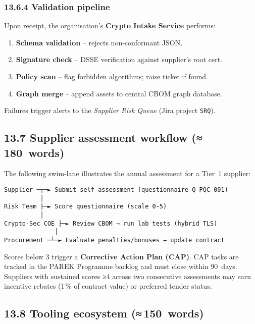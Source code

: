 \documentclass[
  english,
]{article}
\providecommand{\tightlist}{%
  \setlength{\itemsep}{0pt}\setlength{\parskip}{0pt}}
\begin{document}
\subsubsection{13.6.4 Validation pipeline}\label{validation-pipeline}

Upon receipt, the organisation's \textbf{Crypto Intake Service}
performs:

\begin{enumerate}
\def\labelenumi{\arabic{enumi}.}
\tightlist
\item
  \textbf{Schema validation} -- rejects non‑conformant JSON.
\item
  \textbf{Signature check} -- DSSE verification against supplier's root
  cert.
\item
  \textbf{Policy scan} -- flag forbidden algorithms; raise ticket if
  found.
\item
  \textbf{Graph merge} -- append assets to central CBOM graph database.
\end{enumerate}

Failures trigger alerts to the \emph{Supplier Risk Queue} (Jira project
\texttt{SRQ}).

\subsection{13.7 Supplier assessment workflow
(≈\,180~words)}\label{supplier-assessment-workflow-180-words}

The following swim‑lane illustrates the annual assessment for a Tier~1
supplier:

\begin{verbatim}
Supplier ─┬─► Submit self‑assessment (questionnaire Q‑PQC‑001)
          │
Risk Team ├─► Score questionnaire (scale 0‑5)
          │
Crypto‑Sec COE ├─► Review CBOM → run lab tests (hybrid TLS)
              │
Procurement ─┴─► Evaluate penalties/bonuses → update contract
\end{verbatim}

Scores below 3 trigger a \textbf{Corrective Action Plan (CAP)}. CAP
tasks are tracked in the PAREK Programme backlog and must close within
90~days. Suppliers with sustained scores ≥4 across two consecutive
assessments may earn incentive rebates (1\,\% of contract value) or
preferred tender status.

\subsection{13.8 Tooling ecosystem
(≈\,150~words)}\label{tooling-ecosystem-150-words}
\end{document}
